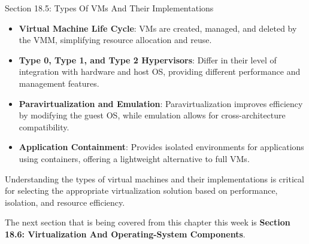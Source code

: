 \begin{notes}{Section 18.5: Types Of VMs And Their Implementations}
\begin{highlight}
    \end{highlight}
    
    \begin{highlight}
    
        \begin{itemize}
            \item \textbf{Virtual Machine Life Cycle}: VMs are created, managed, and deleted by the VMM, simplifying resource allocation and reuse.
            \item \textbf{Type 0, Type 1, and Type 2 Hypervisors}: Differ in their level of integration with hardware and host OS, providing different performance and management features.
            \item \textbf{Paravirtualization and Emulation}: Paravirtualization improves efficiency by modifying the guest OS, while emulation allows for cross-architecture compatibility.
            \item \textbf{Application Containment}: Provides isolated environments for applications using containers, offering a lightweight alternative to full VMs.
        \end{itemize}
    
    Understanding the types of virtual machines and their implementations is critical for selecting the appropriate virtualization solution based on performance, isolation, and resource efficiency.
    
    \end{highlight}
\end{notes}

The next section that is being covered from this chapter this week is \textbf{Section 18.6: Virtualization And Operating-System Components}.

